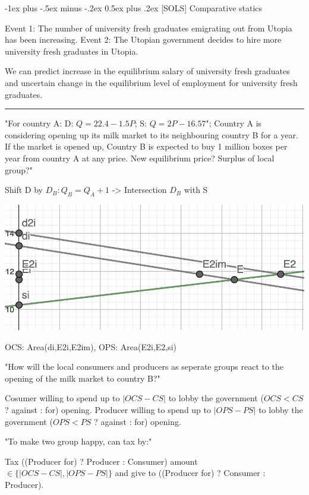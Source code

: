 \documentclass[a4paper]{article}
\makeatletter
\renewcommand{\section}{\@startsection{section}{1}{0mm}%
                                {-1ex plus -.5ex minus -.2ex}%
                                {0.5ex plus .2ex}%
                                {\normalfont\large\bfseries}}
\makeatother
\begin{document}
\begin{multicols*}{3}
        \section{[SOLS] Comparative statics}

        Event 1: The number of university fresh graduates emigrating out from Utopia has been increasing.
        Event 2: The Utopian government decides to hire more university fresh graduates in Utopia.

        We can predict increase in the equilibrium salary of university fresh graduates and uncertain change in the equilibrium level of employment for university fresh graduates.

        \rule{1\linewidth}{0.4pt}

        "For country A: D: $Q = 22.4-1.5P$; S: $Q=2P-16.57$"; Country A is considering opening up its milk market to its neighbouring country B for a year. If the market is opened up, Country B is expected to buy 1 million boxes per year from country A at any price. New equilibrium price? Surplus of local group?"

        Shift D by $D_B: Q_B=Q_A+1$ -> Intersection $D_B$ with S

        \includegraphics[width=\linewidth]{./i2.png}

        OCS: Area(di,E2i,E2im), OPS: Area(E2i,E2,si)

        "How will the local consumers and producers as seperate groups react to the opening of the milk market to country B?"

        Cosumer willing to spend up to $|OCS-CS|$ to lobby the government ($OCS < CS$ ? against : for) opening.
        Producer willing to spend up to $|OPS-PS|$ to lobby the government ($OPS < PS$ ? against : for) opening.

        "To make two group happy, can tax by:"

        Tax ((Producer for) ? Producer : Consumer) amount $\in \{|OCS-CS|, |OPS-PS|\}$ and give to ((Producer for) ? Consumer : Producer).


\end{multicols*}
\end{document}
